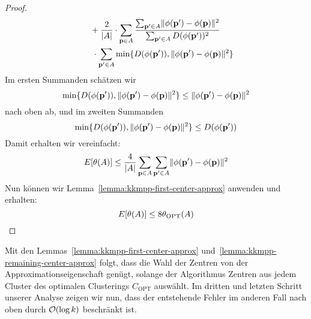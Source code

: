 \begin{proof}
\begin{align*}
						& \; \; \; \; \; + \frac{2}{\left|A\right|} \cdot
							\sum_{\mathbf{p} \in A} \frac{\sum_{\mathbf{p}' \in A} \lVert {\phi(\ensuremath{\mathbf{p}}')} - {\phi(\mathbf{p})} \rVert^2}{\sum_{\mathbf{p}' \in A} D(\phi(\mathbf{p}'))^2} \\
						& \; \; \; \; \; \; \cdot \sum_{\mathbf{p}' \in A} \min \{ D(\phi(\mathbf{p}')), \lVert {\phi(\ensuremath{\mathbf{p}}')} - {\phi(\mathbf{p})} \rVert^2 \}
	\end{align*}
	Im ersten Summanden schätzen wir
	\[ \min \{ D(\phi(\mathbf{p}')), \lVert {\phi(\ensuremath{\mathbf{p}}')} - {\phi(\mathbf{p})} \rVert^2 \} \leq \lVert {\phi(\ensuremath{\mathbf{p}}')} - {\phi(\mathbf{p})} \rVert^2 \]
	nach oben ab, und im zweiten Summanden
	\[ \min \{ D(\phi(\mathbf{p}')), \lVert {\phi(\ensuremath{\mathbf{p}}')} - {\phi(\mathbf{p})} \rVert^2 \} \leq D(\phi(\mathbf{p}')) \]
	Damit erhalten wir vereinfacht:
	\[ E[\theta(A)] \leq \frac{4}{\left|A\right|} \sum_{\mathbf{p} \in A} \sum_{\mathbf{p}' \in A} \lVert {\phi(\ensuremath{\mathbf{p}}')} - {\phi(\mathbf{p})} \rVert^2 \]
	Nun können wir Lemma~\ref{lemma:kkmpp-first-center-approx} anwenden und erhalten:
	\[ E[\theta(A)] \leq 8 \theta_{\textrm{OPT}}(A) \]
\end{proof}
Mit den Lemmas~\ref{lemma:kkmpp-first-center-approx} und~\ref{lemma:kkmpp-remaining-center-approx} folgt, dass
die Wahl der Zentren von \kkmpp{} der Approximationseigenschaft genügt, solange der Algorithmus Zentren aus jedem Cluster
des optimalen Clusterings $C_\textrm{OPT}$ auswählt. Im dritten und letzten Schritt unserer Analyse zeigen wir nun,
dass der entstehende Fehler im anderen Fall nach oben durch $\mathcal{O}(\log k)$ beschränkt ist.